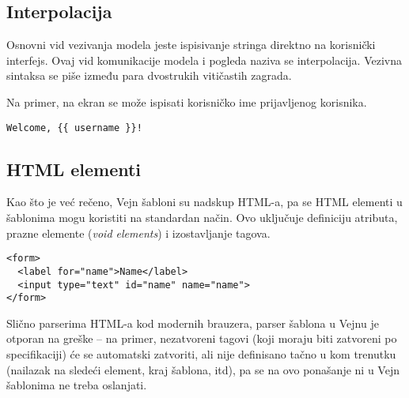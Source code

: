 
\subsection{Interpolacija}

Osnovni vid vezivanja modela jeste ispisivanje stringa direktno na korisnički interfejs.
Ovaj vid komunikacije modela i pogleda naziva se interpolacija.
Vezivna sintaksa se piše između para dvostrukih vitičastih zagrada.

Na primer, na ekran se može ispisati korisničko ime prijavljenog korisnika.

\begin{verbatim}
Welcome, {{ username }}!
\end{verbatim}

\subsection{HTML elementi}

Kao što je već rečeno, Vejn šabloni su nadskup HTML-a, pa se HTML elementi u šablonima mogu koristiti na standardan način.
Ovo uključuje definiciju atributa, prazne elemente (\textsl{void elements}) i izostavljanje tagova.

\begin{verbatim}
<form>
  <label for="name">Name</label>
  <input type="text" id="name" name="name">
</form>
\end{verbatim}

Slično parserima HTML-a kod modernih brauzera, parser šablona u Vejnu je otporan na greške -- na primer, nezatvoreni tagovi (koji moraju biti zatvoreni po specifikaciji) će se automatski zatvoriti, ali nije definisano tačno u kom trenutku (nailazak na sledeći element, kraj šablona, itd), pa se na ovo ponašanje ni u Vejn šablonima ne treba oslanjati.

